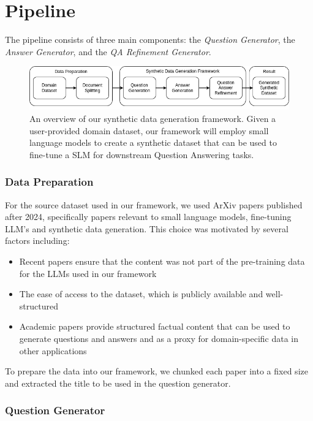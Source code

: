 \section{Pipeline}\label{sec:pipeline}

The pipeline consists of three main components: the \textit{Question Generator}, the \textit{Answer Generator}, and the \textit{QA Refinement Generator}.

\begin{figure}[h]
  \centering
  \includegraphics[width=\textwidth]{methodology-overview.png}
  \caption{An overview of our synthetic data generation framework. Given a user-provided domain dataset, our
framework will employ small language models to create a synthetic dataset that can be used
to fine-tune a SLM for downstream Question Answering tasks.}
\end{figure}

\subsubsection{Data Preparation}
For the source dataset used in our framework, we used ArXiv papers published after 2024, specifically papers relevant to
small language models, fine-tuning LLM's and synthetic data generation.
This choice was motivated by several factors including:
\begin{itemize}
  \item Recent papers ensure that the content was not part of the pre-training data for the LLMs used in our framework
  \item The ease of access to the dataset, which is publicly available and well-structured
  \item Academic papers provide structured factual content that can be used to generate questions and answers and as a proxy for
  domain-specific data in other applications
\end{itemize}

To prepare the data into our framework, we chunked each paper into a fixed size and extracted the title to be used in the
question generator.

\subsubsection{Question Generator}

